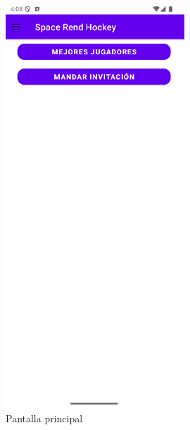 \documentclass[a4paper,openright,12pt]{article}
\begin{document}
\begin{figure}[htp]
\begin{minipage}{0.3\textwidth}
        \includegraphics[width=0.6\textwidth]{Images/Vista_It4_2.png} 
        \caption{Pantalla principal}
        \label{fig:pantalla principal}
    \end{minipage}
\end{figure}
\end{document}
